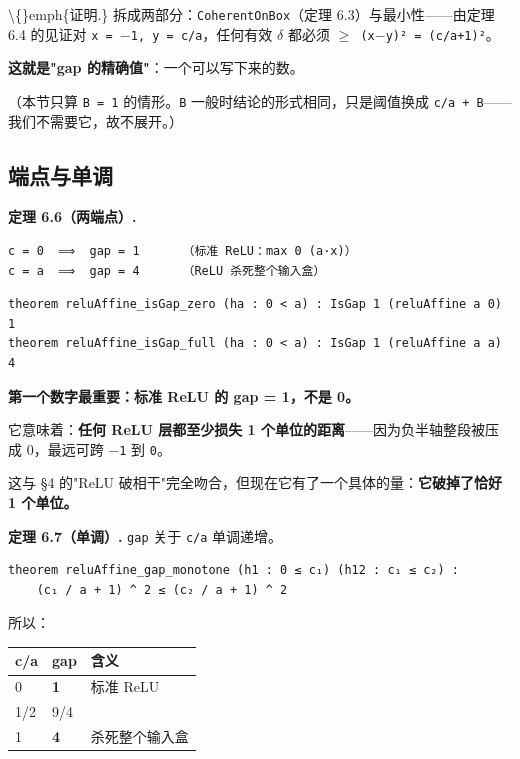 \documentclass[11pt,a4paper]{ctexart}
\begin{document}
\textbackslash\{\}emph\{证明.\} 拆成两部分：\texttt{CoherentOnBox}（定理 6.3）与最小性——由定理 6.4 的见证对 \texttt{x = \ensuremath{-}1, y = c/a}，任何有效 \texttt{\ensuremath{\delta}} 都必须 \texttt{\ensuremath{\ge} (x\ensuremath{-}y)² = (c/a+1)²}。

\textbf{这就是"gap 的精确值"}：一个可以写下来的数。

（本节只算 \texttt{B = 1} 的情形。\texttt{B} 一般时结论的形式相同，只是阈值换成 \texttt{c/a + B}——我们不需要它，故不展开。）

\subsection{端点与单调}

\textbf{定理 6.6（两端点）.}

\begin{lstlisting}
c = 0  ⟹  gap = 1      （标准 ReLU：max 0 (a·x)）
c = a  ⟹  gap = 4      （ReLU 杀死整个输入盒）
\end{lstlisting}

\begin{lstlisting}
theorem reluAffine_isGap_zero (ha : 0 < a) : IsGap 1 (reluAffine a 0) 1
theorem reluAffine_isGap_full (ha : 0 < a) : IsGap 1 (reluAffine a a) 4
\end{lstlisting}

\textbf{第一个数字最重要：标准 ReLU 的 gap = 1，不是 0。}

它意味着：\textbf{任何 ReLU 层都至少损失 1 个单位的距离}——因为负半轴整段被压成 0，最远可跨 \texttt{\ensuremath{-}1} 到 \texttt{0}。

这与 §4 的"ReLU 破相干"完全吻合，但现在它有了一个具体的量：\textbf{它破掉了恰好 1 个单位。}

\textbf{定理 6.7（单调）.} \texttt{gap} 关于 \texttt{c/a} 单调递增。

\begin{lstlisting}
theorem reluAffine_gap_monotone (h1 : 0 ≤ c₁) (h12 : c₁ ≤ c₂) :
    (c₁ / a + 1) ^ 2 ≤ (c₂ / a + 1) ^ 2
\end{lstlisting}

所以：

\begin{center}\small
\begin{tabular}{lll}
\toprule
c/a & gap & 含义 \\
\midrule
0 & \textbf{1} & 标准 ReLU \\
1/2 & 9/4 &  \\
1 & \textbf{4} & 杀死整个输入盒 \\
\bottomrule
\end{tabular}
\end{center}
\end{document}
